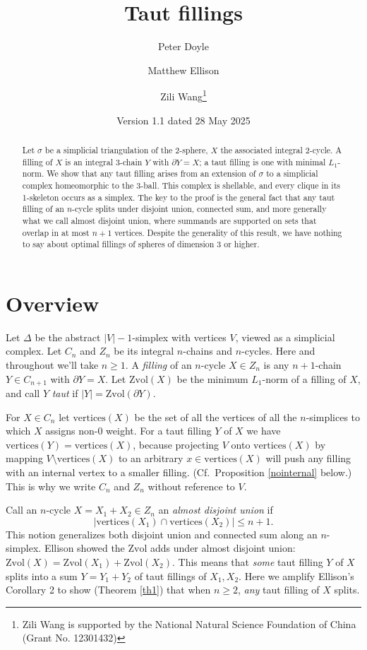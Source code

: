 \documentclass[12pt]{article}
\title{Taut fillings}
\author{Peter Doyle \and Matthew Ellison \and Zili Wang\thanks{
Zili Wang is supported by
the National Natural Science Foundation of China (Grant No. 12301432)
}}
\date{Version 1.1 dated 28 May 2025
}
\def\del{\partial}
\newcommand{\kw}{\mathrm}
\newcommand{\vertices}{\kw{vertices}}
\newcommand{\Zvol}{\kw{Zvol}}
\begin{document}
\maketitle

\begin{abstract}
Let $\sigma$ be a simplicial triangulation of the 2-sphere,
$X$ the associated integral 2-cycle.
A filling of $X$ is an integral 3-chain $Y$
with $\del Y = X$;
a taut filling is one with minimal $L_1$-norm.
We show that any taut filling 
arises from an extension of $\sigma$ to
a simplicial complex homeomorphic to the 3-ball.
This complex is shellable, and
every clique in its 1-skeleton occurs as a simplex.
The key to the proof is the general
fact that any taut filling of an $n$-cycle
splits under disjoint union, connected sum, and more generally
what we call almost disjoint union,
where summands are supported on sets that overlap in at most $n+1$ vertices.
Despite the generality of this result, we have nothing to say about
optimal fillings of spheres of dimension 3 or higher.
\end{abstract}

\section{Overview}
Let $\Delta$ be the abstract $|V|-1$-simplex with vertices $V$,
viewed as a simplicial complex.
Let $C_n$ and $Z_n$ be its integral $n$-chains and $n$-cycles.
Here and throughout we'll take $n \geq 1$.
A \emph{filling} of an $n$-cycle $X \in Z_n$ is any
$n+1$-chain $Y \in C_{n+1}$ with $\del Y = X$.
Let $\Zvol(X)$ be the minimum $L_1$-norm of a filling of $X$,
and call $Y$ \emph{taut} if $|Y|=\Zvol(\del Y)$.

For $X \in C_n$ let
$\vertices(X)$ be the set of all the vertices of all the $n$-simplices
to which $X$ assigns non-$0$ weight.
For a taut filling $Y$ of $X$ we have $\vertices(Y) = \vertices(X)$,
because projecting $V$ onto $\vertices(X)$ by mapping
$V \setminus \vertices(X)$ to an arbitrary $x \in \vertices(X)$
will push any filling with an internal vertex to a smaller filling.
(Cf.\ Proposition \ref{nointernal} below.)
This is why we write $C_n$ and $Z_n$ without reference to $V$.

Call an $n$-cycle $X=X_1+X_2 \in Z_n$ an \emph{almost disjoint union} if
\[
|\vertices(X_1) \cap \vertices(X_2)| \leq n+1
.
\]
This notion generalizes both disjoint union and connected sum
along an $n$-simplex.
Ellison \cite{ellison:gap}
showed the $\Zvol$ adds under almost disjoint union:
$\Zvol(X) = \Zvol(X_1) + \Zvol(X_2)$.
This means that \emph{some} taut filling $Y$ of $X$ splits into a sum
$Y=Y_1+Y_2$ of taut fillings of $X_1,X_2$.
Here we amplify Ellison's Corollary 2 to show (Theorem \ref{th1})
that when $n \geq 2$, \emph{any} taut filling of $X$ splits.
\end{document}
